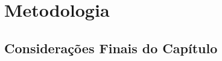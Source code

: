 \chapter{Metodologia} 
\label{chap:metodologia}

\lipsum[2-4]

\section{Considerações Finais do Capítulo}
\label{subsec:rcond_cap_4}

\lipsum[1-4]